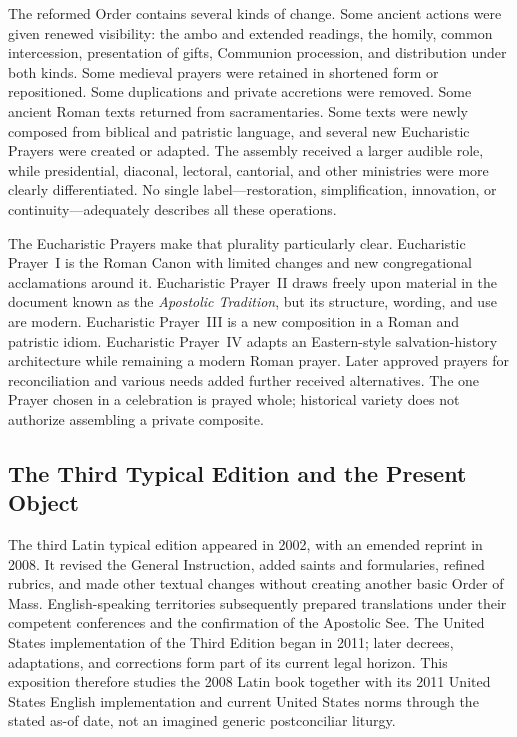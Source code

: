 The reformed Order contains several kinds of change. Some ancient actions were given renewed visibility: the ambo and extended readings, the homily, common intercession, presentation of gifts, Communion procession, and distribution under both kinds. Some medieval prayers were retained in shortened form or repositioned. Some duplications and private accretions were removed. Some ancient Roman texts returned from sacramentaries. Some texts were newly composed from biblical and patristic language, and several new Eucharistic Prayers were created or adapted. The assembly received a larger audible role, while presidential, diaconal, lectoral, cantorial, and other ministries were more clearly differentiated. No single label---restoration, simplification, innovation, or continuity---adequately describes all these operations.

The Eucharistic Prayers make that plurality particularly clear. Eucharistic Prayer~I is the Roman Canon with limited changes and new congregational acclamations around it. Eucharistic Prayer~II draws freely upon material in the document known as the \emph{Apostolic Tradition}, but its structure, wording, and use are modern. Eucharistic Prayer~III is a new composition in a Roman and patristic idiom. Eucharistic Prayer~IV adapts an Eastern-style salvation-history architecture while remaining a modern Roman prayer. Later approved prayers for reconciliation and various needs added further received alternatives. The one Prayer chosen in a celebration is prayed whole; historical variety does not authorize assembling a private composite.

\subsection{The Third Typical Edition and the Present Object}

The third Latin typical edition appeared in 2002, with an emended reprint in 2008. It revised the General Instruction, added saints and formularies, refined rubrics, and made other textual changes without creating another basic Order of Mass. English-speaking territories subsequently prepared translations under their competent conferences and the confirmation of the Apostolic See. The United States implementation of the Third Edition began in 2011; later decrees, adaptations, and corrections form part of its current legal horizon. This exposition therefore studies the 2008 Latin book together with its 2011 United States English implementation and current United States norms through the stated as-of date, not an imagined generic postconciliar liturgy.

